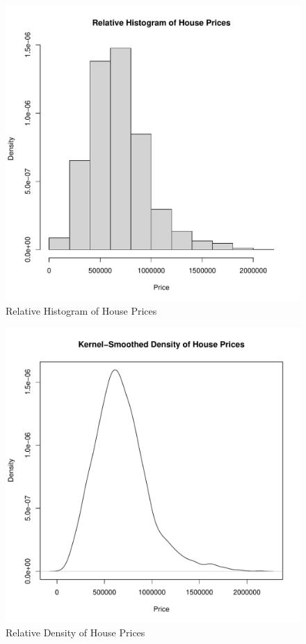 %
\begin{figure}[h!]
  \centering
  \includegraphics[scale = 0.5, keepaspectratio=true]{../Figures/hist_prices}
  \caption{Relative Histogram of House Prices} \label{fig:hist_prices}
\end{figure}
%
%
\begin{figure}[h!]
  \centering
  \includegraphics[scale = 0.5, keepaspectratio=true]{../Figures/density_Price}
  \caption{Relative Density of House Prices} \label{fig:density_Price}
\end{figure}
%
%

